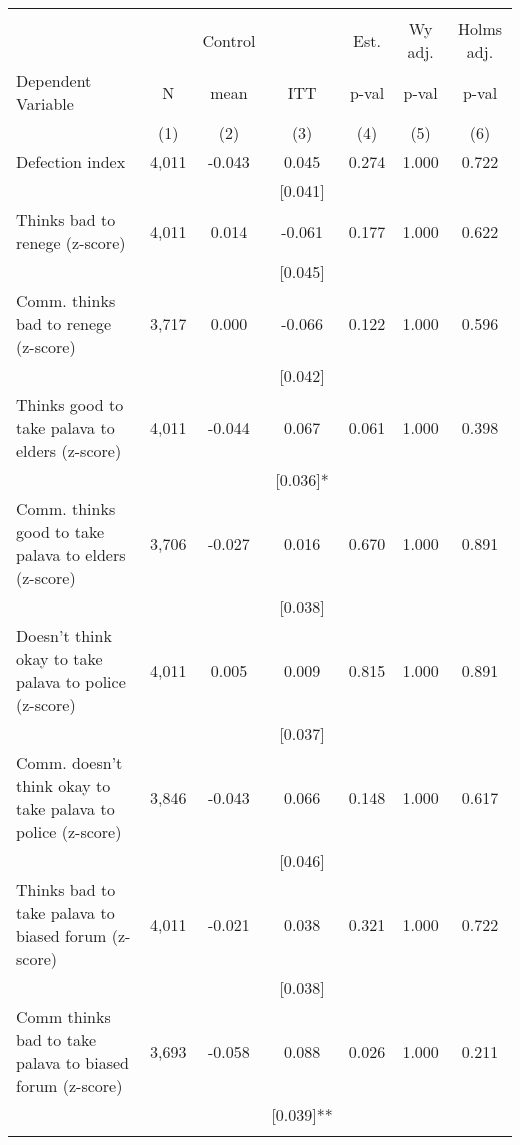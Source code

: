 \begin{tabular}{lcccccc}
\hline \noalign{\smallskip} &  &  &  &  &  & \\
 &  & Control &  & Est. & Wy adj. & Holms adj.\\
Dependent Variable & N & mean & ITT & p-val & p-val & p-val\\
 & (1) & (2) & (3) & (4) & (5) & (6)\\
\noalign{\smallskip}\hline \noalign{\smallskip}Defection index & 4,011 & -0.043 & 0.045 & 0.274 & 1.000 & 0.722\\
 &  &  & [0.041] &  &  & \\
\quad Thinks bad to renege (z-score) & 4,011 & 0.014 & -0.061 & 0.177 & 1.000 & 0.622\\
 &  &  & [0.045] &  &  & \\
\quad Comm. thinks bad to renege (z-score) & 3,717 & 0.000 & -0.066 & 0.122 & 1.000 & 0.596\\
 &  &  & [0.042] &  &  & \\
\quad Thinks good to take palava to elders (z-score) & 4,011 & -0.044 & 0.067 & 0.061 & 1.000 & 0.398\\
 &  &  & [0.036]* &  &  & \\
\quad Comm. thinks good to take palava to elders (z-score) & 3,706 & -0.027 & 0.016 & 0.670 & 1.000 & 0.891\\
 &  &  & [0.038] &  &  & \\
\quad Doesn't think okay to take palava to police (z-score) & 4,011 & 0.005 & 0.009 & 0.815 & 1.000 & 0.891\\
 &  &  & [0.037] &  &  & \\
\quad Comm. doesn't think okay to take palava to police (z-score) & 3,846 & -0.043 & 0.066 & 0.148 & 1.000 & 0.617\\
 &  &  & [0.046] &  &  & \\
\quad Thinks bad to take palava to biased forum (z-score) & 4,011 & -0.021 & 0.038 & 0.321 & 1.000 & 0.722\\
 &  &  & [0.038] &  &  & \\
\quad Comm thinks bad to take palava to biased forum (z-score) & 3,693 & -0.058 & 0.088 & 0.026 & 1.000 & 0.211\\
 &  &  & [0.039]** &  &  & \\
\noalign{\smallskip}\hline\end{tabular}
